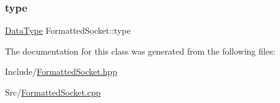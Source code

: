 \mbox{\label{class_formatted_socket_a167e37871d020747121819c2bdc746e5}} 
\subsubsection{\texorpdfstring{type}{type}}
{\footnotesize\ttfamily \mbox{\hyperlink{_formatted_socket_8hpp_ad8ed01ff3ff33333d8e19db4d2818bb6}{Data\+Type}} Formatted\+Socket\+::type}



The documentation for this class was generated from the following files\+:\begin{DoxyCompactItemize}
\item 
Include/\mbox{\hyperlink{_formatted_socket_8hpp}{Formatted\+Socket.\+hpp}}\item 
Src/\mbox{\hyperlink{_formatted_socket_8cpp}{Formatted\+Socket.\+cpp}}\end{DoxyCompactItemize}
